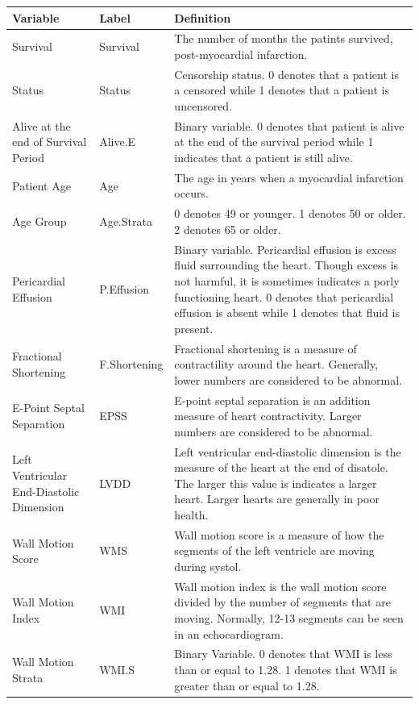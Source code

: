 \documentclass[
]{article}
\begin{document}
\begin{tabu} to 
\hline
Variable & Label & Definition\\
\hline
Survival & Survival & The number of months the patints survived, post-myocardial infarction.\\
\hline
Status & Status & Censorship status. 0 denotes that a patient is a censored while 1 denotes that a patient is uncensored.\\
\hline
Alive at the end of Survival Period & Alive.E & Binary variable. 0 denotes that patient is alive at the end of the survival period while 1 indicates that a patient is still alive.\\
\hline
Patient Age & Age & The age in years when a myocardial infarction occurs.\\
\hline
Age Group & Age.Strata & 0 denotes 49 or younger. 1 denotes 50 or older. 2 denotes 65 or older.\\
\hline
Pericardial Effusion & P.Effusion & Binary variable. Pericardial effusion is excess fluid surrounding the heart. Though excess is not harmful, it is sometimes indicates a porly functioning heart. 0 denotes that pericardial effusion is absent while 1 denotes that fluid is present.\\
\hline
Fractional Shortening & F.Shortening & Fractional shortening is a measure of contractility around the heart. Generally, lower numbers are considered to be abnormal.\\
\hline
E-Point Septal Separation & EPSS & E-point septal separation is an addition measure of heart contractivity. Larger numbers are considered to be abnormal.\\
\hline
Left Ventricular End-Diastolic Dimension & LVDD & Left ventricular end-diastolic dimension is the measure of the heart at the end of disatole. The larger this value is indicates a larger heart. Larger hearts are generally in poor health.\\
\hline
Wall Motion Score & WMS & Wall motion score is a measure of how the segments of the left ventricle are moving during systol.\\
\hline
Wall Motion Index & WMI & Wall motion index is the wall motion score divided by the number of segments that are moving. Normally, 12-13 segments can be seen in an echocardiogram.\\
\hline
Wall Motion Strata & WMI.S & Binary Variable. 0 denotes that WMI is less than or equal to 1.28. 1 denotes that WMI is greater than or equal to 1.28.\\
\hline
\end{tabu}
\end{document}
